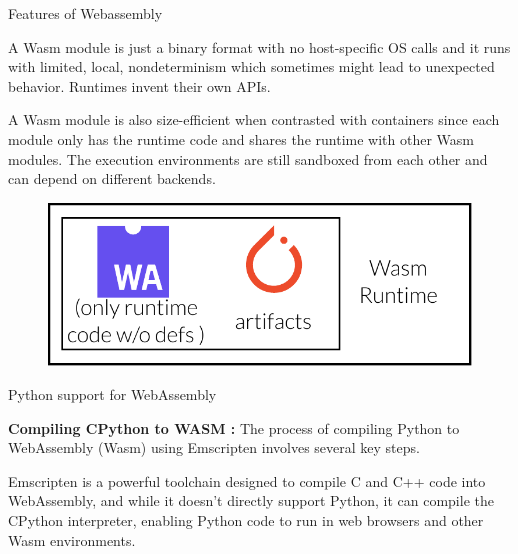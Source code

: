 \documentclass[final]{beamer}
\newlength{\colwidth}
\begin{document}
\begin{frame}[t]
\begin{columns}[t]
\begin{column}{\colwidth}
\begin{block}{Features of Webassembly}
            \begin{minipage}[t]{.65\textwidth}
                A Wasm module is just a binary format with no host-specific OS calls and it runs with limited, local, nondeterminism which sometimes might lead to unexpected behavior. Runtimes invent their own APIs.
            \end{minipage}
            \begin{minipage}[t]{.65\textwidth}
                \raggedright
                A Wasm module is also size-efficient when contrasted with containers since each module only has the runtime code and shares the runtime with other Wasm modules. The execution environments are still sandboxed from each other and can depend on different backends.
            \end{minipage}\hfill
            \begin{minipage}[t]{.30\textwidth}
            \vspace{-1em}
                \begin{figure}[t]
                \centering
                \includegraphics[width=\textwidth]{figures/size.pdf}
                \end{figure}
                \raggedleft
            \end{minipage}
        \end{block}
    
    
      \begin{block}{Python support for WebAssembly}
      
    
          \item \textbf { Compiling CPython to WASM : } The process of compiling Python to WebAssembly (Wasm) using Emscripten involves several key steps. 
    
          
          Emscripten is a powerful toolchain designed to compile C and C++ code into WebAssembly, and while it doesn't directly support Python, it can compile the CPython interpreter, enabling Python code to run in web browsers and other Wasm environments. 
    

\end{block}
\end{column}
\end{columns}
\end{frame}
\end{document}
